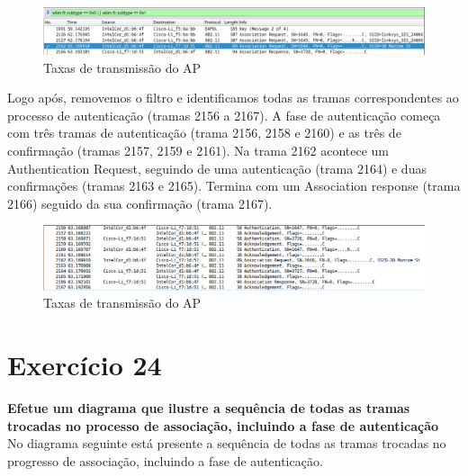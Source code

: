 \documentclass[a4paper]{report}
\begin{document}
\begin{figure}[H]
    \centering 
    \includegraphics[width=\textwidth]{images/filterEx23.png}  
    \caption{Taxas de transmissão do AP}
    \label{fig:filterEx23}
\end{figure}
Logo após, removemos o filtro e identificamos todas as tramas correspondentes ao processo 
de autenticação (tramas 2156 a 2167). A fase de autenticação começa com três
tramas de autenticação (trama 2156, 2158 e 2160) e as três de confirmação
(tramas 2157, 2159 e 2161). Na trama 2162 acontece um Authentication Request,
seguindo de uma autenticação (trama 2164) e duas confirmações (tramas 2163 e
2165). Termina com um Association response (trama 2166) seguido da sua
confirmação (trama 2167).

\begin{figure}[H]
    \centering 
    \includegraphics[width=\textwidth]{images/nofilterEx23.png}  
    \caption{Taxas de transmissão do AP}
    \label{fig:nofilterEx23}
\end{figure}

\section{Exercício 24}
\textbf{Efetue um diagrama que ilustre a sequência de todas as tramas trocadas
no processo de associação, incluindo a fase de autenticação}\\
No diagrama seguinte está presente a sequência de todas as tramas trocadas no
progresso de associação, incluindo a fase de autenticação.
\end{document}
